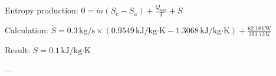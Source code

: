 Entropy production:  
\( 0 = \dot{m} (S_e - S_a) + \frac{Q_{aus}}{T} + \dot{S} \)  

Calculation:  
\( \dot{S} = 0.3 \, \text{kg/s} \times (0.9549 \, \text{kJ/kg·K} - 1.3068 \, \text{kJ/kg·K}) + \frac{62.18 \, \text{kW}}{293.72 \, \text{K}} \)  

Result:  
\( \dot{S} = 0.1 \, \text{kJ/kg·K} \)  

---